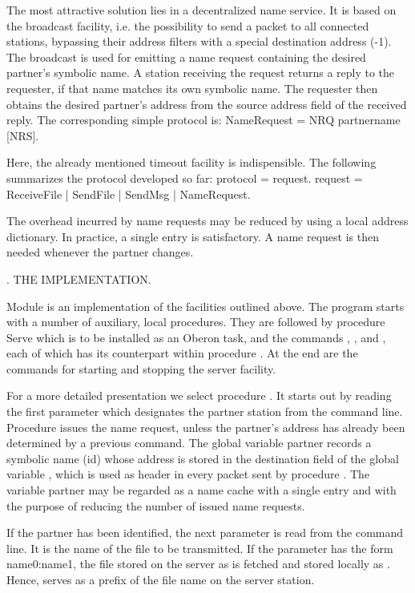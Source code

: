 The most attractive solution lies in a decentralized name service. It is based on the broadcast facility, i.e. the possibility to send a packet to all connected stations, bypassing their address filters with a special destination address (-1). The broadcast is used for emitting a name request containing the desired partner's symbolic name. A station receiving the request returns a reply to the requester, if that name matches its own symbolic name. The requester then obtains the desired partner's address from the source address field of the received reply. The corresponding simple protocol is:
\begintt
NameRequest = NRQ partnername [NRS].
\endtt

\noindent Here, the already mentioned timeout facility is indispensible. The following summarizes the protocol developed so far:
\begintt
protocol = {request}.
request = ReceiveFile | SendFile | SendMsg | NameRequest.
\endtt

\noindent The overhead incurred by name requests may be reduced by using a local address dictionary. In practice, a single entry is satisfactory. A name request is then needed whenever the partner changes.

. THE IMPLEMENTATION.

Module  is an implementation of the facilities outlined above. The program starts with a number of auxiliary, local procedures. They are followed by procedure Serve which is to be installed as an Oberon task, and the commands , , and , each of which has its counterpart within procedure . At the end are the commands for starting and stopping the server facility.

For a more detailed presentation we select procedure . It starts out by reading the first parameter which designates the partner station from the command line. Procedure  issues the name request, unless the partner's address has already been determined by a previous command. The global variable partner records a symbolic name (id) whose address is stored in the destination field of the global variable , which is used as header in every packet sent by procedure . The variable partner may be regarded as a name cache with a single entry and with the purpose of reducing the number of issued name requests.

If the partner has been identified, the next parameter is read from the command line. It is the name of the file to be transmitted. If the parameter has the form name0:name1, the file stored on the server as  is fetched and stored locally as . Hence,  serves as a prefix of the file name on the server station.

